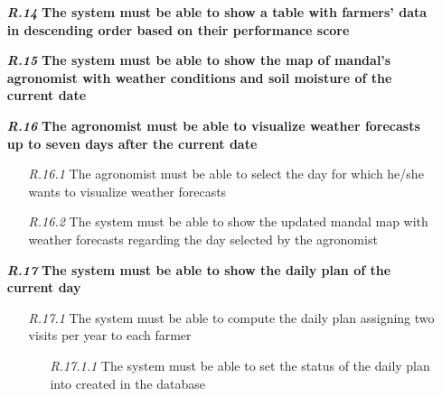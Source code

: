 \begin{itemize}
\item [\textbf{\textit{R.14}}] \textbf{The system must be able to show a table with farmers' data in descending order based on their performance score}
\item [\textbf{\textit{R.15}}] \textbf{The system must be able to show the map of mandal's agronomist with weather conditions and soil moisture of the current date}
\item [\textbf{\textit{R.16}}] \textbf{The agronomist must be able to visualize weather forecasts up to seven days after the current date}
        \begin{itemize}
            \item [\textit{R.16.1}] The agronomist must be able to select the day for which he/she wants to visualize weather forecasts
	        \item [\textit{R.16.2}] The system must be able to show the updated mandal map with weather forecasts regarding the day selected by the agronomist
        \end{itemize}
        \item [\textbf{\textit{R.17}}] \textbf{The system must be able to show the daily plan of the current day}
        \begin{itemize}
            \item [\textit{R.17.1}] The system must be able to compute the daily plan assigning two visits per year to each farmer
            \begin{itemize}
                \item [\textit{R.17.1.1}] The system must be able to set the status of the daily plan into created in the database
            \end{itemize}
        \end{itemize}
		


\end{itemize}
